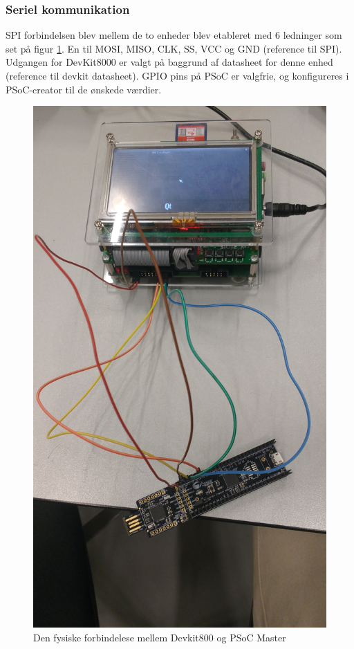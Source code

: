 \subsubsection{Seriel kommunikation}

SPI forbindelsen blev mellem de to enheder blev etableret med 6 ledninger som set på figur \ref{ffm_DK8k_PSoC}. En til MOSI, MISO, CLK, SS, VCC og GND (reference til SPI).
Udgangen for DevKit8000 er valgt på baggrund af datasheet for denne enhed (reference til devkit datasheet). GPIO pins på PSoC er valgfrie, og konfigureres 
i PSoC-creator til de ønskede værdier.

\begin{figure}[H]
	\centerline{\includegraphics[scale=0.07]{tex/TeImRe/SPI/Realisering_devkit_psoc}}
	\caption{Den fysiske forbindelese mellem Devkit800 og PSoC Master}
	\label{ffm_DK8k_PSoC}
\end{figure}

